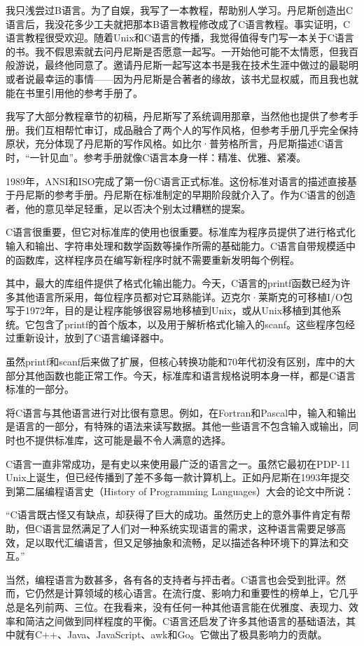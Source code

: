 \documentclass[a4paper,12pt,UTF8,twoside]{ctexbook}
\begin{document}
我只浅尝过B语言。为了自娱，我写了一本教程，帮助别人学习。丹尼斯创造出C语言后，我没花多少工夫就把那本B语言教程修改成了C语言教程。事实证明，C语言教程很受欢迎。随着Unix和C语言的传播，我觉得值得专门写一本关于C语言的书。我不假思索就去问丹尼斯是否愿意一起写。一开始他可能不太情愿，但我百般游说，最终他同意了。邀请丹尼斯一起写这本书是我在技术生涯中做过的最聪明或者说最幸运的事情——因为丹尼斯是合著者的缘故，该书尤显权威，而且我也就能在书里引用他的参考手册了。

我写了大部分教程章节的初稿，丹尼斯写了系统调用那章，当然他也提供了参考手册。我们互相帮忙审订，成品融合了两个人的写作风格，但参考手册几乎完全保持原状，充分体现了丹尼斯的写作风格。如比尔·普劳格所言，丹尼斯描述C语言时，“一针见血”。参考手册就像C语言本身一样：精准、优雅、紧凑。

1989年，ANSI和ISO完成了第一份C语言正式标准。这份标准对语言的描述直接基于丹尼斯的参考手册。丹尼斯在标准制定的早期阶段就介入了。作为C语言的创造者，他的意见举足轻重，足以否决个别太过糟糕的提案。

C语言很重要，但它对标准库的使用也很重要。标准库为程序员提供了进行格式化输入和输出、字符串处理和数学函数等操作所需的基础能力。C语言自带规模适中的函数库，这样程序员在编写新程序时就不需要重新发明每个例程。

其中，最大的库组件提供了格式化输出能力。今天，C语言的printf函数已经为许多其他语言所采用，每位程序员都对它耳熟能详。迈克尔·莱斯克的可移植I/O包写于1972年，目的是让程序能够很容易地移植到Unix，或从Unix移植到其他系统。它包含了printf的首个版本，以及用于解析格式化输入的scanf。这些程序包经过重新设计，放到了C语言编译器中。

虽然printf和scanf后来做了扩展，但核心转换功能和70年代初没有区别，库中的大部分其他函数也能正常工作。今天，标准库和语言规格说明本身一样，都是C语言标准的一部分。

将C语言与其他语言进行对比很有意思。例如，在Fortran和Pascal中，输入和输出是语言的一部分，有特殊的语法来读写数据。其他一些语言不包含输入或输出，同时也不提供标准库，这可能是最不令人满意的选择。

C语言一直非常成功，是有史以来使用最广泛的语言之一。虽然它最初在PDP-11 Unix上诞生，但已经传播到了差不多每一款计算机上。正如丹尼斯在1993年提交到第二届编程语言史（History of Programming Languages）大会的论文中所说：

“C语言既古怪又有缺点，却获得了巨大的成功。虽然历史上的意外事件肯定有帮助，但C语言显然满足了人们对一种系统实现语言的需求，这种语言需要足够高效，足以取代汇编语言，但又足够抽象和流畅，足以描述各种环境下的算法和交互。”

当然，编程语言为数甚多，各有各的支持者与抨击者。C语言也会受到批评。然而，它仍然是计算领域的核心语言。在流行度、影响力和重要性的榜单上，它几乎总是名列前两、三位。在我看来，没有任何一种其他语言能在优雅度、表现力、效率和简洁之间做到同样程度的平衡。C语言还启发了许多其他语言的基础语法，其中就有C++、Java、JavaScript、awk和Go。它做出了极具影响力的贡献。
\end{document}
